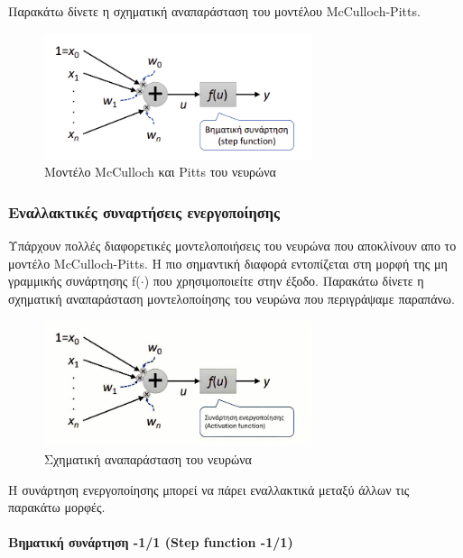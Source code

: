 \documentclass[12pt]{article}
\numberwithin{equation}{section}
\begin{document}
\noindent Παρακάτω δίνετε η σχηματική αναπαράσταση του μοντέλου McCulloch-Pitts.

\begin{figure}[h!]
  \centering
  \includegraphics[width=0.7\textwidth]{images/McCulloch-Pitts.png} %
  \caption{Μοντέλο McCulloch και Pitts του νευρώνα}
  \label{figure 10}
\end{figure}

\subsubsection{Εναλλακτικές συναρτήσεις ενεργοποίησης} 

Υπάρχουν πολλές διαφορετικές μοντελοποιήσεις του νευρώνα που αποκλίνουν απο το μοντέλο McCulloch-Pitts. Η πιο σημαντική διαφορά εντοπίζεται στη μορφή της μη γραμμικής συνάρτησης f(\(\cdot\)) που χρησιμοποιείτε στην έξοδο. Παρακάτω δίνετε η σχηματική αναπαράσταση μοντελοποίησης του νευρώνα που περιγράψαμε παραπάνω. \\

\begin{figure}[h!]
  \centering
  \includegraphics[width=0.7\textwidth]{images/neuron_modeling.png} %
  \caption{Σχηματική αναπαράσταση του νευρώνα}
  \label{figure 11}
\end{figure} 

\noindent Η συνάρτηση ενεργοποίησης μπορεί να πάρει εναλλακτικά μεταξύ άλλων τις παρακάτω μορφές.\\

\paragraph{Βηματική συνάρτηση -1/1 (Step function -1/1)\\[0.5cm]}
\end{document}

